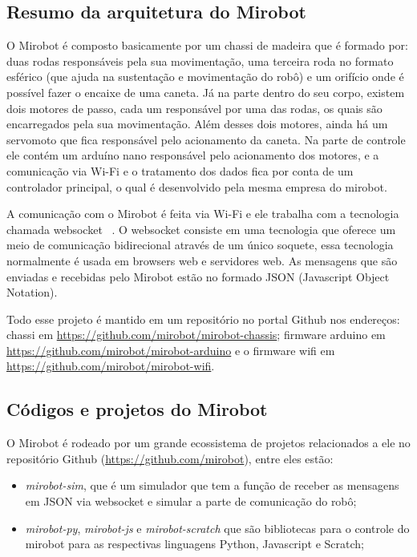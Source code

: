 \subsection{Resumo da arquitetura do Mirobot}


O Mirobot é composto basicamente por um chassi de madeira que é formado por:
duas rodas responsáveis pela sua movimentação, uma terceira roda no formato
esférico (que ajuda na sustentação e movimentação do robô) e um orifício onde é
possível fazer o encaixe de uma caneta.
Já na parte dentro do seu corpo,
existem dois motores de passo, cada um responsável por uma das rodas, os quais
são encarregados pela sua movimentação. 
Além desses dois motores, ainda há um
servomoto que fica responsável pelo acionamento da caneta. 
Na parte de controle
ele contém um arduíno nano responsável pelo acionamento dos motores, e a
comunicação via Wi-Fi e o tratamento dos dados fica por conta de um controlador
principal, o qual é desenvolvido pela mesma empresa do mirobot.

A comunicação com o Mirobot é feita via Wi-Fi e ele trabalha com a tecnologia
chamada websocket ~\cite{websocket2011}. O websocket consiste em uma tecnologia que oferece um meio
de comunicação bidirecional através de um único soquete, essa tecnologia
normalmente é usada em browsers web e servidores web. 
As mensagens que são
enviadas e recebidas pelo Mirobot estão no formado JSON (Javascript Object
Notation).

Todo esse projeto é mantido em um repositório no portal Github nos endereços: chassi em \url{https://github.com/mirobot/mirobot-chassis}; firmware arduino em \url{https://github.com/mirobot/mirobot-arduino} e o firmware wifi em \url{https://github.com/mirobot/mirobot-wifi}.

\subsection{Códigos e projetos do Mirobot}
\label{subsec:mirobotcodigos}


O Mirobot é rodeado por um grande ecossistema de projetos relacionados a ele no
repositório Github (\url{https://github.com/mirobot}), entre eles estão:

\begin{itemize}
    \item \textit{mirobot-sim}, que é um simulador
que tem a função de receber as mensagens em JSON via websocket e simular a
parte de comunicação do robô;
    \item \textit{mirobot-py}, \textit{mirobot-js} e \textit{mirobot-scratch} que são
bibliotecas para o controle do mirobot para as respectivas linguagens Python,
Javascript e Scratch;
\end{itemize}

